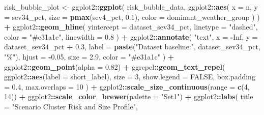 \documentclass[
]{article}
\newenvironment{Shaded}{\begin{snugshade}}{\end{snugshade}}
\newcommand{\AttributeTok}[1]{\textcolor[rgb]{0.13,0.29,0.53}{#1}}
\newcommand{\ConstantTok}[1]{\textcolor[rgb]{0.56,0.35,0.01}{#1}}
\newcommand{\DecValTok}[1]{\textcolor[rgb]{0.00,0.00,0.81}{#1}}
\newcommand{\FloatTok}[1]{\textcolor[rgb]{0.00,0.00,0.81}{#1}}
\newcommand{\FunctionTok}[1]{\textcolor[rgb]{0.13,0.29,0.53}{\textbf{#1}}}
\newcommand{\NormalTok}[1]{#1}
\newcommand{\OtherTok}[1]{\textcolor[rgb]{0.56,0.35,0.01}{#1}}
\newcommand{\SpecialCharTok}[1]{\textcolor[rgb]{0.81,0.36,0.00}{\textbf{#1}}}
\newcommand{\StringTok}[1]{\textcolor[rgb]{0.31,0.60,0.02}{#1}}
\begin{document}
\begin{Shaded}
\begin{Highlighting}[]
\NormalTok{risk\_bubble\_plot }\OtherTok{\textless{}{-}}\NormalTok{ ggplot2}\SpecialCharTok{::}\FunctionTok{ggplot}\NormalTok{(}
\NormalTok{  risk\_bubble\_data,}
\NormalTok{  ggplot2}\SpecialCharTok{::}\FunctionTok{aes}\NormalTok{(}
    \AttributeTok{x     =}\NormalTok{ n,}
    \AttributeTok{y     =}\NormalTok{ sev34\_pct,}
    \AttributeTok{size  =} \FunctionTok{pmax}\NormalTok{(sev4\_pct, }\FloatTok{0.1}\NormalTok{),}
    \AttributeTok{color =}\NormalTok{ dominant\_weather\_group}
\NormalTok{  )}
\NormalTok{) }\SpecialCharTok{+}
\NormalTok{  ggplot2}\SpecialCharTok{::}\FunctionTok{geom\_hline}\NormalTok{(}
    \AttributeTok{yintercept =}\NormalTok{ dataset\_sev34\_pct, }\AttributeTok{linetype =} \StringTok{"dashed"}\NormalTok{,}
    \AttributeTok{color =} \StringTok{"\#e31a1c"}\NormalTok{, }\AttributeTok{linewidth =} \FloatTok{0.8}
\NormalTok{  ) }\SpecialCharTok{+}
\NormalTok{  ggplot2}\SpecialCharTok{::}\FunctionTok{annotate}\NormalTok{(}
    \StringTok{"text"}\NormalTok{, }\AttributeTok{x =} \SpecialCharTok{{-}}\ConstantTok{Inf}\NormalTok{, }\AttributeTok{y =}\NormalTok{ dataset\_sev34\_pct }\SpecialCharTok{+} \FloatTok{0.3}\NormalTok{,}
    \AttributeTok{label =} \FunctionTok{paste}\NormalTok{(}\StringTok{"Dataset baseline:"}\NormalTok{, dataset\_sev34\_pct, }\StringTok{"\%"}\NormalTok{),}
    \AttributeTok{hjust =} \SpecialCharTok{{-}}\FloatTok{0.05}\NormalTok{, }\AttributeTok{size =} \FloatTok{2.9}\NormalTok{, }\AttributeTok{color =} \StringTok{"\#e31a1c"}
\NormalTok{  ) }\SpecialCharTok{+}
\NormalTok{  ggplot2}\SpecialCharTok{::}\FunctionTok{geom\_point}\NormalTok{(}\AttributeTok{alpha =} \FloatTok{0.82}\NormalTok{) }\SpecialCharTok{+}
\NormalTok{  ggrepel}\SpecialCharTok{::}\FunctionTok{geom\_text\_repel}\NormalTok{(}
\NormalTok{    ggplot2}\SpecialCharTok{::}\FunctionTok{aes}\NormalTok{(}\AttributeTok{label =}\NormalTok{ short\_label),}
    \AttributeTok{size =} \DecValTok{3}\NormalTok{, }\AttributeTok{show.legend =} \ConstantTok{FALSE}\NormalTok{,}
    \AttributeTok{box.padding =} \FloatTok{0.4}\NormalTok{, }\AttributeTok{max.overlaps =} \DecValTok{10}
\NormalTok{  ) }\SpecialCharTok{+}
\NormalTok{  ggplot2}\SpecialCharTok{::}\FunctionTok{scale\_size\_continuous}\NormalTok{(}\AttributeTok{range =} \FunctionTok{c}\NormalTok{(}\DecValTok{4}\NormalTok{, }\DecValTok{14}\NormalTok{)) }\SpecialCharTok{+}
\NormalTok{  ggplot2}\SpecialCharTok{::}\FunctionTok{scale\_color\_brewer}\NormalTok{(}\AttributeTok{palette =} \StringTok{"Set1"}\NormalTok{) }\SpecialCharTok{+}
\NormalTok{  ggplot2}\SpecialCharTok{::}\FunctionTok{labs}\NormalTok{(}
    \AttributeTok{title    =} \StringTok{"Scenario Cluster Risk and Size Profile"}\NormalTok{,}

\end{Highlighting}
\end{Shaded}
\end{document}

